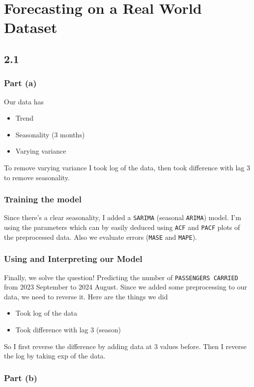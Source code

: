 \section{Forecasting on a Real World Dataset}
\subsection{2.1}
\subsubsection{Part (a)}
Our data has
\begin{itemize}[nosep]
	\item Trend
	\item Seasonality (3 months)
	\item Varying variance
\end{itemize}

To remove varying variance I took log of the data, then took difference with
lag 3 to remove seasonality.
\subsubsection{Training the model}
Since there's a clear seasonality, I added a \texttt{SARIMA} (seasonal \texttt{ARIMA}) model.
I'm using the parameters which can by easily deduced using \texttt{ACF} and \texttt{PACF} plots
of the preprocessed data. Also we evaluate errors (\texttt{MASE} and \texttt{MAPE}).
\subsubsection{Using and Interpreting our Model}
Finally, we solve the question! Predicting the number of \texttt{PASSENGERS CARRIED}
from 2023 September to 2024 August. Since we added some preprocessing to our
data, we need to reverse it. Here are the things we did
\begin{itemize}[nosep]
	\item Took log of the data
	\item Took difference with lag 3 (season)
\end{itemize}

So I first reverse the difference by adding data at 3 values before. Then I
reverse the log by taking exp of the data.

\subsubsection{Part (b)}

